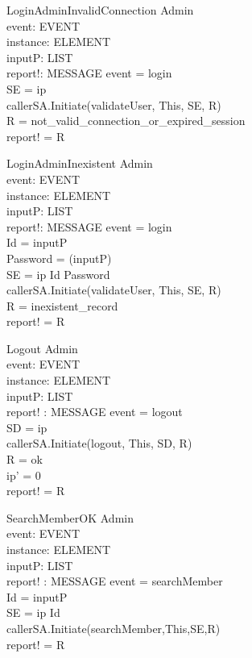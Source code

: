 \begin{schema}{LoginAdminInvalidConnection}
\Delta Admin  \\
event: EVENT \\
instance: ELEMENT \\
inputP: LIST \\
report!: MESSAGE
\where event = login \\
SE = \lseq ip \rseq \\
callerSA.Initiate(validateUser, This, SE, R) \\
R = not\_valid\_connection\_or\_expired\_session \\ 
report! = R
\end{schema}

\begin{schema}{LoginAdminInexistent}
\Delta Admin  \\
event: EVENT \\
instance: ELEMENT \\
inputP: LIST \\
report!: MESSAGE
\where event = login \\
Id = \head inputP \\
Password = \head (\tail inputP) \\
SE = \lseq ip Id Password  \rseq \\
callerSA.Initiate(validateUser, This, SE, R)\\
R = inexistent\_record \\
report! = R 
\end{schema}

\begin{schema}{Logout}
\Delta Admin \\ 
event: EVENT \\
instance: ELEMENT \\
inputP: LIST \\
report! : MESSAGE 
\where event = logout \\
SD = \lseq ip \rseq \\
callerSA.Initiate(logout, This, SD, R) \\
R = ok \\
ip' = 0 \\
report! = R 
\end{schema}

\begin{schema}{SearchMemberOK}
\Xi Admin \\
event: EVENT \\
instance: ELEMENT \\
inputP: LIST \\
report! : MESSAGE 
\where event = searchMember \\
Id = \head inputP \\
SE = \lseq ip Id \rseq \\
callerSA.Initiate(searchMember,This,SE,R)\\
report! = R
\end{schema}

